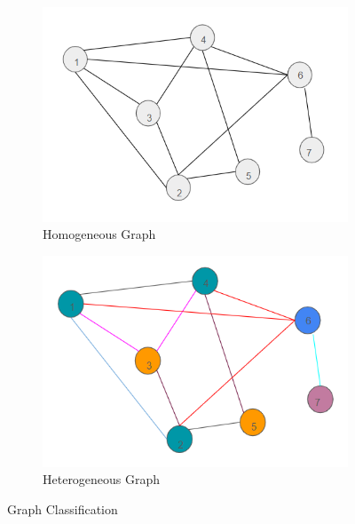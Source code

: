 \documentclass{report} %
\begin{document}
\begin{figure}[H]
    \centering
    \begin{subfigure}{0.35\textwidth}
        \centering
        \includegraphics[width=\textwidth]{./ReportImages/HomogeneousGraph.png}
        \caption{Homogeneous Graph} %
        \label{fig:Homogeneous Graph}
    \end{subfigure}
    \begin{subfigure}{0.35\textwidth}
        \centering
        \includegraphics[width=\textwidth]{./ReportImages/HeterogeneousGraph.png}
        \caption{Heterogeneous Graph}
        \label{fig:Heterogeneous Graph}
    \end{subfigure}
    \caption{Graph Classification}
    \label{fig:Graph Classification}
\end{figure}
\end{document}
